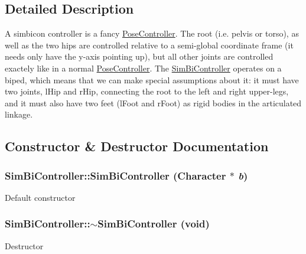 \subsection{Detailed Description}
A simbicon controller is a fancy \hyperlink{classCartWheel_1_1Core_1_1PoseController}{PoseController}. The root (i.e. pelvis or torso), as well as the two hips are controlled relative to a semi-\/global coordinate frame (it needs only have the y-\/axis pointing up), but all other joints are controlled exactely like in a normal \hyperlink{classCartWheel_1_1Core_1_1PoseController}{PoseController}. The \hyperlink{classCartWheel_1_1Core_1_1SimBiController}{SimBiController} operates on a biped, which means that we can make special assumptions about it: it must have two joints, lHip and rHip, connecting the root to the left and right upper-\/legs, and it must also have two feet (lFoot and rFoot) as rigid bodies in the articulated linkage. 

\subsection{Constructor \& Destructor Documentation}
\hypertarget{classCartWheel_1_1Core_1_1SimBiController_a25e623cc1dff40619bee3baa5b48ceb5}{
\subsubsection[{SimBiController}]{\setlength{\rightskip}{0pt plus 5cm}SimBiController::SimBiController ({\bf Character} $\ast$ {\em b})}}
\label{classCartWheel_1_1Core_1_1SimBiController_a25e623cc1dff40619bee3baa5b48ceb5}
Default constructor \hypertarget{classCartWheel_1_1Core_1_1SimBiController_a75f31006b3f9d1a66281c1121f8b6617}{
\subsubsection[{$\sim$SimBiController}]{\setlength{\rightskip}{0pt plus 5cm}SimBiController::$\sim$SimBiController (void)}}
\label{classCartWheel_1_1Core_1_1SimBiController_a75f31006b3f9d1a66281c1121f8b6617}
Destructor 


